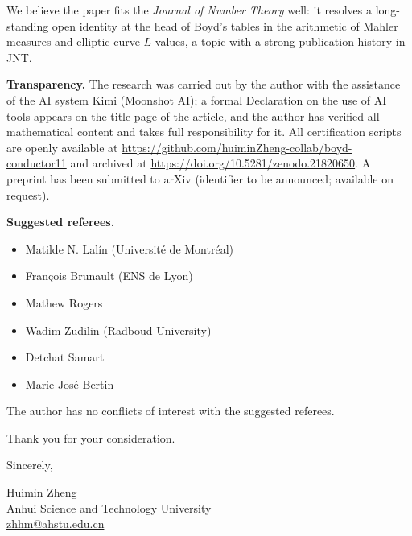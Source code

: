 \documentclass[11pt]{article}
\begin{document}
We believe the paper fits the \emph{Journal of Number Theory} well: it
resolves a long-standing open identity at the head of Boyd's tables in
the arithmetic of Mahler measures and elliptic-curve $L$-values, a
topic with a strong publication history in JNT.

\textbf{Transparency.} The research was carried out by the author with
the assistance of the AI system Kimi (Moonshot AI); a formal
Declaration on the use of AI tools appears on the title page of the
article, and the author has verified all mathematical content and
takes full responsibility for it. All certification scripts are openly
available at \url{https://github.com/huiminZheng-collab/boyd-conductor11}
and archived at \url{https://doi.org/10.5281/zenodo.21820650}. A
preprint has been submitted to arXiv (identifier to be announced;
available on request).

\textbf{Suggested referees.}
\begin{itemize}
\item Matilde N. Lal\'in (Universit\'e de Montr\'eal)
\item Fran\c{c}ois Brunault (ENS de Lyon)
\item Mathew Rogers
\item Wadim Zudilin (Radboud University)
\item Detchat Samart
\item Marie-Jos\'e Bertin
\end{itemize}
The author has no conflicts of interest with the suggested referees.

Thank you for your consideration.

\vspace{2em}
Sincerely,

Huimin Zheng\\
Anhui Science and Technology University\\
\url{zhhm@ahstu.edu.cn}
\end{document}
